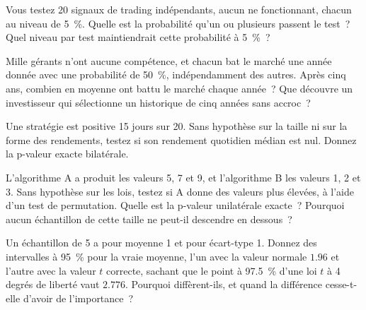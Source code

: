 \begin{question}\label{iq:iv1:statistics:5}
Vous testez 20 signaux de trading indépendants, aucun ne fonctionnant, chacun au niveau de 5~\%. Quelle est la probabilité qu'un ou plusieurs passent le test~? Quel niveau par test maintiendrait cette probabilité à 5~\%~?
\end{question}

\begin{question}\label{iq:iv1:statistics:6}
Mille gérants n'ont aucune compétence, et chacun bat le marché une année donnée avec une probabilité de 50~\%, indépendamment des autres. Après cinq ans, combien en moyenne ont battu le marché chaque année~? Que découvre un investisseur qui sélectionne un historique de cinq années sans accroc~?
\end{question}

\begin{question}\label{iq:iv1:statistics:7}
Une stratégie est positive 15 jours sur 20. Sans hypothèse sur la taille ni sur la forme des rendements, testez si son rendement quotidien médian est nul. Donnez la p-valeur exacte bilatérale.
\end{question}

\begin{question}\label{iq:iv1:statistics:8}
L'algorithme A a produit les valeurs 5, 7 et 9, et l'algorithme B les valeurs 1, 2 et 3. Sans hypothèse sur les lois, testez si A donne des valeurs plus élevées, à l'aide d'un test de permutation. Quelle est la p-valeur unilatérale exacte~? Pourquoi aucun échantillon de cette taille ne peut-il descendre en dessous~?
\end{question}

\begin{question}\label{iq:iv1:statistics:9}
Un échantillon de 5 a pour moyenne 1 et pour écart-type 1. Donnez des intervalles à 95~\% pour la vraie moyenne, l'un avec la valeur normale $1.96$ et l'autre avec la valeur $t$ correcte, sachant que le point à 97.5~\% d'une loi $t$ à 4 degrés de liberté vaut $2.776$. Pourquoi diffèrent-ils, et quand la différence cesse-t-elle d'avoir de l'importance~?
\end{question}

